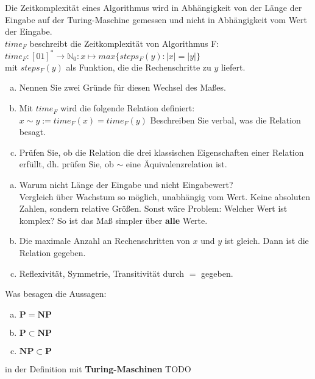 \begin{card}
	Die Zeitkomplexität eines Algorithmus wird in Abhängigkeit von der Länge der Eingabe auf der Turing-Maschine gemessen und nicht in Abhängigkeit vom Wert der Eingabe.\\
	$time_F$ beschreibt die Zeitkomplexität von Algorithmus F:  $time_F:[01]^* \rightarrow \mathbb{N}_0 : x \mapsto max \{ steps_F(y):|x| = |y| \}$\\
	mit $steps_F(y)$ als Funktion, die die Rechenschritte zu $y$ liefert. 
	\begin{enumerate}[a)]
	\item Nennen Sie zwei Gründe für diesen Wechsel des Maßes. 
	\item Mit
	$time_F$ wird die folgende Relation definiert: 
	$x \sim y := time_F(x) = time_F(y)$
	Beschreiben Sie verbal, was die Relation besagt.
	\item Prüfen Sie, ob die Relation die drei klassischen Eigenschaften einer Relation erfüllt, dh. prüfen Sie, ob $\sim$ eine Äquivalenzrelation ist. 
	\end{enumerate}
	\hr
	\begin{enumerate}[a)]
	\item Warum nicht Länge der Eingabe und nicht Eingabewert?\\
	Vergleich über Wachstum so möglich, unabhängig vom Wert. Keine absoluten Zahlen, sondern relative Größen. Sonst wäre Problem: Welcher Wert ist komplex? So ist das Maß simpler über \textbf{alle} Werte.
	\item Die maximale Anzahl an Rechenschritten von $x$ und $y$ ist gleich. Dann ist die Relation gegeben.
	\item Reflexivität, Symmetrie, Transitivität durch $=$ gegeben.
	\end{enumerate}
\end{card}

\begin{card}
	Was besagen die Aussagen: 
	\begin{enumerate}[a)]
	\item $\mathbf{P = NP}$
	\item $\mathbf{P \subset NP}$
	\item $\mathbf{NP \subset P}$
	\end{enumerate}
	in der Definition mit \textbf{Turing-Maschinen} %
	\hr
	TODO
\end{card}

